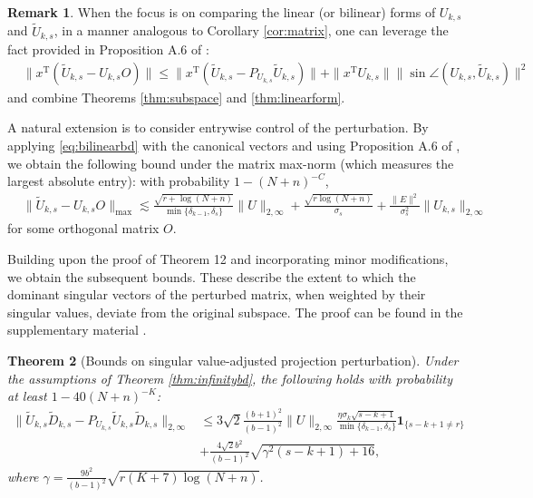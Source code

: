 \documentclass[reqno]{amsart}
\newcommand{\T}{\mathrm{T}}
\theoremstyle{plain}
\newtheorem{theorem}{Theorem}
\theoremstyle{definition}
\newtheorem{remark}[theorem]{Remark}
\begin{document}
\begin{remark}When the focus is on comparing the linear (or bilinear) forms of $U_{k,s}$ and $\widetilde U_{k,s}$, in a manner analogous to Corollary \ref{cor:matrix}, one can leverage the fact provided in Proposition A.6 of \cite{WangSupp24}:
\begin{align*}
&\|x^\T (\widetilde U_{k,s}-U_{k,s}O ) \| \le \|x^\T (\widetilde U_{k,s}-P_{U_{k,s}}\widetilde U_{k,s}) \| + \|x^\T U_{k,s}\| \|\sin\angle(U_{k,s}, \widetilde U_{k,s})\|^2
\end{align*}
and combine Theorems  \ref{thm:subspace} and \ref{thm:linearform}. 

A natural extension is to consider entrywise control of the perturbation. By applying \eqref{eq:bilinearbd} with the canonical vectors and using Proposition A.6 of \cite{WangSupp24}, we obtain the following bound under the matrix max-norm (which measures the largest absolute entry):  with probability $1-(N+n)^{-C}$,
\begin{align}\label{eq:maxbd}
&\|\widetilde U_{k,s} - U_{k,s} O\|_{\max} \lesssim \frac{\sqrt{r+\log(N+n)}}{\min\{\delta_{k-1}, \delta_s\}}\|U\|_{2,\infty} + \frac{\sqrt{r\log(N+n)}}{\sigma_s}+ \frac{\|E\|^2}{\sigma_s^2}\|U_{k,s}\|_{2,\infty}
\end{align}
for some orthogonal matrix $O$. 
\end{remark}

Building upon the proof of Theorem 12 and incorporating minor modifications, we obtain the subsequent bounds. These describe the extent to which the dominant singular vectors of the perturbed matrix, when weighted by their singular values, deviate from the original subspace. The proof can be found in  the supplementary material \cite{WangSupp24}.
\begin{theorem}[Bounds on singular value-adjusted projection perturbation]\label{thm:weighted}Under the assumptions of Theorem \ref{thm:infinitybd}, the following holds with probability at least $1 - 40(N+n)^{-K}$:
\begin{align*}
\| \widetilde{U}_{k,s}\widetilde{D}_{k,s} - P_{U_{k,s}} \widetilde{U}_{k,s} \widetilde{D}_{k,s}\|_{2,\infty} &\le 3\sqrt{2}\frac{(b+1)^2}{(b-1)^2} \| U \|_{2,\infty}  \frac{\eta\sigma_k\sqrt{s-k+1}}{\min\{\delta_{k-1}, \delta_s\}} \mathbf{1}_{\{s-k+1\neq r \}} \nonumber\\
&  + \frac{4\sqrt{2} b^2}{(b-1)^2}  \sqrt{\gamma^2(s-k+1) +16},
\end{align*}
where $\gamma= \frac{9 b^2}{(b-1)^2}\sqrt{r(K+7)\log(N+n)} $. 
\end{theorem}
\end{document}
